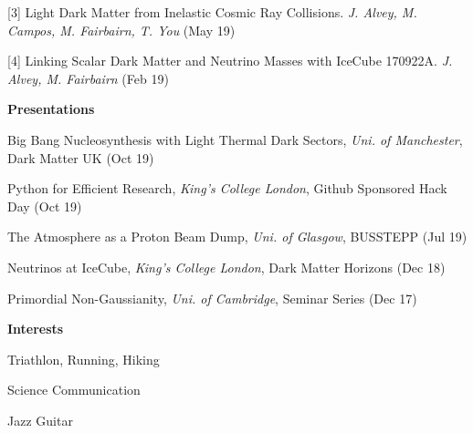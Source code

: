 \documentclass[10pt]{article}
\begin{document}
\begin{minipage}[t]{0.25\linewidth}
{[3] Light Dark Matter from Inelastic Cosmic Ray Collisions. \textit{J. Alvey, M. Campos, M. Fairbairn, T. You} (May 19)
\vspace{0.05cm}

[4] Linking Scalar Dark Matter and Neutrino Masses with IceCube 170922A. \textit{J. Alvey, M. Fairbairn} (Feb 19)
}
\vspace{0.5cm}

{\large {\color{sidebarcol}\textbf{Presentations}}}
\vspace{0.3cm}

{\small

\faAngleRight Big Bang Nucleosynthesis with Light Thermal Dark Sectors, \textit{Uni. of Manchester}, Dark Matter UK (Oct 19)
\vspace{0.05cm}

\faAngleRight Python for Efficient Research, \textit{King's College London}, Github Sponsored Hack Day (Oct 19)

\faAngleRight The Atmosphere as a Proton Beam Dump, \textit{Uni. of Glasgow}, BUSSTEPP (Jul 19)
\vspace{0.05cm}

\faAngleRight Neutrinos at IceCube, \textit{King's College London}, Dark Matter Horizons (Dec 18)
\vspace{0.05cm}

\faAngleRight Primordial Non-Gaussianity, \textit{Uni. of Cambridge}, Seminar Series (Dec 17)

}
\vspace{0.5cm}

{\large {\color{sidebarcol}\textbf{Interests}}}
\vspace{0.3cm}

\faBicycle \hspace{1pt} Triathlon, Running, Hiking

\faFlask \hspace{3.5pt} Science Communication
\vspace{0.01cm}

\faMusic \hspace{2pt} Jazz Guitar


\end{minipage}
\hfill
\end{document}
